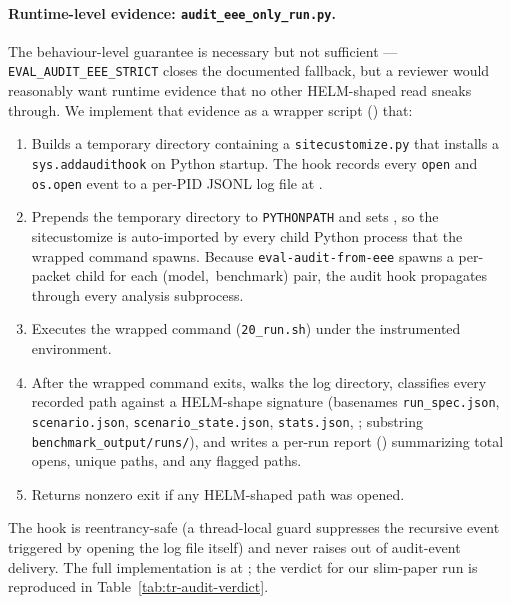 \documentclass[11pt]{article}
\begin{document}
\paragraph{Runtime-level evidence: \texttt{audit\_eee\_only\_run.py}.}
The behaviour-level guarantee is necessary but not sufficient ---
  \texttt{EVAL\_AUDIT\_EEE\_STRICT} closes the documented fallback,
  but a reviewer would reasonably want runtime evidence that no other
  HELM-shaped read sneaks through.
We implement that evidence as a wrapper script
  () that:

\begin{enumerate}
  \item Builds a temporary directory containing a
        \texttt{sitecustomize.py} that installs a
        \texttt{sys.addaudithook} on Python startup.
        The hook records every \texttt{open} and \texttt{os.open}
        event to a per-PID JSONL log file at
        .
  \item Prepends the temporary directory to \texttt{PYTHONPATH} and
        sets , so the
        sitecustomize is auto-imported by every child Python process
        that the wrapped command spawns.
        Because \texttt{eval-audit-from-eee} spawns a per-packet
         child for
        each \mbox{(model, benchmark)} pair, the audit hook propagates
        through every analysis subprocess.
  \item Executes the wrapped command (\texttt{20\_run.sh}) under the
        instrumented environment.
  \item After the wrapped command exits, walks the log directory,
        classifies every recorded path against a HELM-shape signature
        (basenames \texttt{run\_spec.json},
        \texttt{scenario.json}, \texttt{scenario\_state.json},
        \texttt{stats.json}, ;
        substring \texttt{benchmark\_output/runs/}), and writes a
        per-run report
        () summarizing
        total opens, unique paths, and any flagged paths.
  \item Returns nonzero exit if any HELM-shaped path was opened.
\end{enumerate}

The hook is reentrancy-safe (a thread-local guard suppresses the
  recursive event triggered by opening the log file itself) and
  never raises out of audit-event delivery.
The full implementation is at
  ; the verdict for our
  slim-paper run is reproduced in
  Table~\ref{tab:tr-audit-verdict}.
\end{document}
